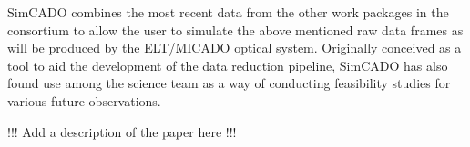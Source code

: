 SimCADO combines the most recent data from the other work packages in the consortium to allow the user to simulate the above mentioned raw data frames as will be produced by the ELT/MICADO optical system. Originally conceived as a tool to aid the development of the data reduction pipeline, SimCADO has also found use among the science team as a way of conducting feasibility studies for various future observations.


!!! Add a description of the paper here !!!